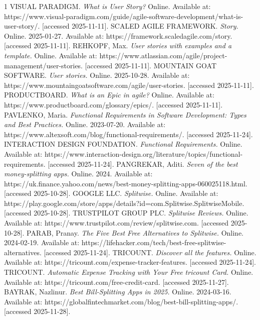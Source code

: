 \documentclass{ctuthesis}
\begin{document}
\begin{thebibliography}{1}
 VISUAL PARADIGM. \emph{What is User Story?} Online. Available at: https://www.visual-paradigm.com/guide/agile-software-development/what-is-user-story/. [accessed 2025-11-11].
 SCALED AGILE FRAMEWORK. \emph{Story.} Online. 2025-01-27. Available at: https://framework.scaledagile.com/story. [accessed 2025-11-11].
 REHKOPF, Max. \emph{User stories with examples and a template.} Online. Available at: https://www.atlassian.com/agile/project-management/user-stories. [accessed 2025-11-11].
 MOUNTAIN GOAT SOFTWARE. \emph{User stories.} Online. 2025-10-28. Available at: https://www.mountaingoatsoftware.com/agile/user-stories. [accessed 2025-11-11].
 PRODUCTBOARD. \emph{What is an Epic in agile?} Online. Available at: https://www.productboard.com/glossary/epics/. [accessed 2025-11-11].
 PAVLENKO, Maria. \emph{Functional Requirements in Software Development: Types and Best Practices.} Online. 2023-07-20. Available at: https://www.altexsoft.com/blog/functional-requirements/. [accessed 2025-11-24].
 INTERACTION DESIGN FOUNDATION. \emph{Functional Requirements.} Online. Available at: https://www.interaction-design.org/literature/topics/functional-requirements. [accessed 2025-11-24].
 PANGREKAR, Aditi. \emph{Seven of the best money-splitting apps.} Online. 2024. Available at: https://uk.finance.yahoo.com/news/best-money-splitting-apps-060025118.html. [accessed 2025-10-28].
 GOOGLE LLC. \emph{Splitwise.} Online. Available at: https://play.google.com/store/apps/details?id=com.Splitwise.SplitwiseMobile. [accessed 2025-10-28].
 TRUSTPILOT GROUP PLC. \emph{Splitwise Reviews.} Online. Available at: https://www.trustpilot.com/review/splitwise.com. [accessed 2025-10-28].
 PARAB, Pranay. \emph{The Five Best Free Alternatives to Splitwise.} Online. 2024-02-19. Available at: https://lifehacker.com/tech/best-free-splitwise-alternatives. [accessed 2025-11-24].
 TRICOUNT. \emph{Discover all the features.} Online. Available at: https://tricount.com/expense-tracker-features. [accessed 2025-11-24].
 TRICOUNT. \emph{Automatic Expense Tracking with Your Free tricount Card.} Online. Available at: https://tricount.com/free-credit-card. [accessed 2025-11-27].
 BAYRAK, Nazlinur. \emph{Best Bill-Splitting Apps in 2025.} Online. 2024-03-16. Available at: https://globalfintechmarket.com/blog/best-bill-splitting-apps/. [accessed 2025-11-28].

\end{thebibliography}
\end{document}
